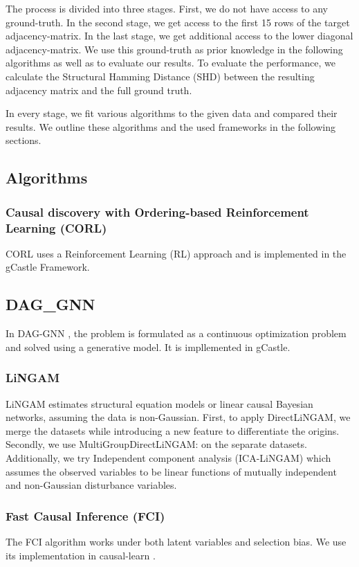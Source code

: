 \documentclass{article}
\begin{document}
    The process is divided into three stages. First, we do not have access to any ground-truth. In the second stage, we get access to the first 15 rows of the target adjacency-matrix. In the last stage, we get additional access to the lower diagonal adjacency-matrix. We use this ground-truth as prior knowledge in the following algorithms as well as to evaluate our results. To evaluate the performance, we calculate the Structural Hamming Distance (SHD) between the resulting adjacency matrix and the full ground truth.

    In every stage, we fit various algorithms to the given data and compared their results. We outline these algorithms and the used frameworks in the following sections.

    \subsection{Algorithms}
    
    \subsubsection{Causal discovery with Ordering-based Reinforcement
    Learning (CORL)}
    CORL\cite{CORL} uses a Reinforcement Learning (RL) approach and is implemented in the gCastle Framework. 

    \subsection{DAG\_GNN}
    In DAG-GNN \cite{DAGGNN}, the problem is formulated as a continuous optimization problem and solved using a generative model. It is impllemented in gCastle. 

    \subsubsection{LiNGAM}
    LiNGAM estimates structural equation models or linear causal Bayesian networks, assuming the data is non-Gaussian.
    First, to apply DirectLiNGAM\cite{lingam}, we merge the datasets while introducing a new feature to differentiate the origins. 
    Secondly, we use MultiGroupDirectLiNGAM: \cite{multilingam} on the separate datasets.
    Additionally, we try Independent component analysis (ICA-LiNGAM)\cite{ICALINGAM} which assumes the observed variables to be linear functions of mutually independent and non-Gaussian disturbance variables.

    \subsubsection{Fast Causal Inference (FCI)}
    The FCI algorithm \cite{FCI} works under both latent variables and selection bias. We use its implementation in causal-learn \cite{Causallearn}.
\end{document}
